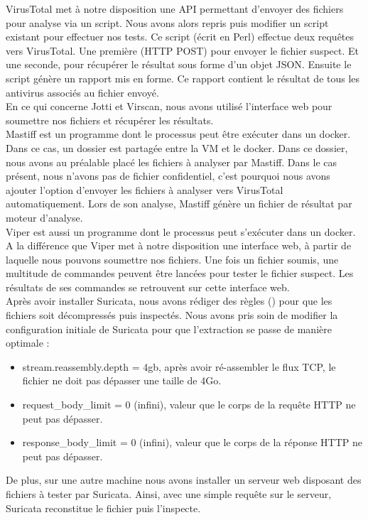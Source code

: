 \documentclass[smallextended]{svjour3}       %
\begin{document}
$ $\\
VirusTotal met à notre disposition une API permettant d'envoyer des fichiers pour analyse via un script. Nous avons alors repris puis modifier un script existant pour effectuer nos tests. Ce script (écrit en Perl) effectue deux requêtes vers VirusTotal. Une première (HTTP POST) pour envoyer le fichier suspect. Et une seconde, pour récupérer le résultat sous forme d'un objet JSON. Ensuite le script génère un rapport mis en forme. Ce rapport contient le résultat de tous les antivirus associés au fichier envoyé.\\
$ $\\
En ce qui concerne Jotti et Virscan, nous avons utilisé l'interface web pour soumettre nos fichiers et récupérer les résultats.\\
$ $\\
Mastiff est un programme dont le processus peut être exécuter dans un docker. Dans ce cas, un dossier est partagée entre la VM et le docker. Dans ce dossier, nous avons au préalable placé les fichiers à analyser par Mastiff. Dans le cas présent, nous n'avons pas de fichier confidentiel, c'est pourquoi nous avons ajouter l'option d'envoyer les fichiers à analyser vers VirusTotal automatiquement. Lors de son analyse, Mastiff génère un fichier de résultat par moteur d'analyse.\\
$ $\\
Viper est aussi un programme dont le processus peut s’exécuter dans un docker. A la différence que Viper met à notre disposition une interface web, à partir de laquelle nous pouvons soumettre nos fichiers. Une fois un fichier soumis, une multitude de commandes peuvent être lancées pour tester le fichier suspect. Les résultats de ses commandes se retrouvent sur cette interface web.\\
$ $\\
Après avoir installer Suricata, nous avons rédiger des règles (\cite{SuricataExtraction}) pour que les fichiers soit décompressés puis inspectés. 
Nous avons pris soin de modifier la configuration initiale de Suricata pour que l'extraction se passe de manière optimale :
\begin{itemize}
\item stream.reassembly.depth = 4gb, après avoir ré-assembler le flux TCP, le fichier ne doit pas dépasser une taille de 4Go.
\item request\_body\_limit = 0 (infini), valeur que le corps de la requête HTTP ne peut pas dépasser.
\item response\_body\_limit = 0 (infini), valeur que le corps de la réponse HTTP ne peut pas dépasser.
\end{itemize}
De plus, sur une autre machine nous avons installer un serveur web disposant des fichiers à tester par Suricata. Ainsi, avec une simple requête sur le serveur, Suricata reconstitue le fichier puis l'inspecte.
\end{document}

